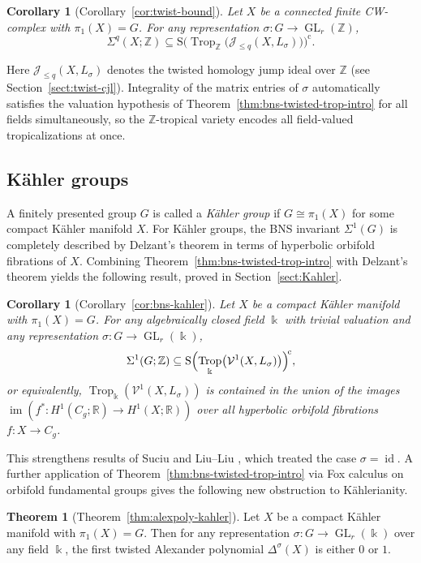 \documentclass[11pt]{amsart}
\newtheorem{corollary}[theorem]{Corollary}
\theoremstyle{definition}
\newtheorem{theoremalph}{Theorem}
\newcommand{\Z}{\mathbb{Z}}
\newcommand{\R}{\mathbb{R}}
\renewcommand{\k}{\Bbbk}
\newcommand{\VV}{\mathcal{V}}
\newcommand{\cJ}{\mathcal{J}}
\newcommand{\rS}{\mathrm{S}}
\DeclareMathOperator{\im}{im}
\DeclareMathOperator{\id}{id}
\DeclareMathOperator{\GL}{GL}
\DeclareMathOperator{\Trop}{Trop}
\newcommand{\compl}{\mathrm{c}}
\begin{document}
\begin{corollary}[Corollary~\ref{cor:twist-bound}]
\label{cor:twist-bound-intro}
Let $X$ be a connected finite CW-complex with $\pi_1(X)=G$.
For any representation $\sigma\colon G\to \GL_r(\Z)$,
\[
\Sigma^q(X;\Z) \subseteq
\rS\bigl(\!\Trop_\Z\bigl(\cJ_{\le q}(X,L_{\sigma})\bigr)\bigr)^{\compl}.
\]
\end{corollary}

Here $\cJ_{\leq q}(X,L_\sigma)$ denotes the twisted homology jump ideal over
$\Z$ (see Section~\ref{sect:twist-cjl}). Integrality of the matrix entries
of $\sigma$ automatically satisfies the valuation hypothesis of
Theorem~\ref{thm:bns-twisted-trop-intro} for all fields
simultaneously, so the $\Z$-tropical variety encodes all
field-valued tropicalizations at once.

\subsection{K\"ahler groups}
\label{apps:intro}

A finitely presented group $G$ is called a \emph{K\"ahler group}
if $G\cong \pi_1(X)$ for some compact K\"ahler manifold $X$.
For K\"ahler groups, the BNS invariant $\Sigma^1(G)$ is completely
described by Delzant's theorem \cite{De10} in terms of hyperbolic
orbifold fibrations of $X$. Combining Theorem~\ref{thm:bns-twisted-trop-intro}
with Delzant's theorem yields the following result, proved in Section~\ref{sect:Kahler}.

\begin{corollary}[Corollary~\ref{cor:bns-kahler}]
\label{cor:bns-kahler-intro}
Let $X$ be a compact K\"ahler manifold with $\pi_1(X)=G$.
For any algebraically closed field $\k$ with trivial valuation
and any representation $\sigma\colon G\to \GL_r(\k)$,
\[
\Sigma^1(G;\Z) \subseteq
\rS \Bigl(\Trop_\k\bigl(\VV^1(X,L_\sigma)\bigr)\Bigr)^{\!\compl},
\]
or equivalently, $\Trop_\k(\VV^1(X,L_\sigma))$ is contained in the
union of the images $\im(f^{*}\colon H^1(C_g;\R)\to H^1(X;\R))$ over
all hyperbolic orbifold fibrations $f\colon X\to C_g$.
\end{corollary}

This strengthens results of Suciu \cite{Su-mathann} and
Liu--Liu \cite{LL}, which treated the case $\sigma=\id$.
A further application of Theorem~\ref{thm:bns-twisted-trop-intro}
via Fox calculus on orbifold fundamental groups
gives the following new obstruction to K\"ahlerianity.

\begin{theoremalph}[Theorem~\ref{thm:alexpoly-kahler}]
\label{thm:intro-kahler}
Let $X$ be a compact K\"ahler manifold with $\pi_1(X)=G$.
Then for any representation $\sigma\colon G\to \GL_r(\k)$
over any field $\k$, the first twisted Alexander polynomial
$\Delta^\sigma(X)$ is either $0$ or $1$.
\end{theoremalph}
\end{document}
